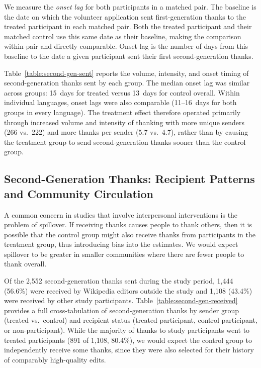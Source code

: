 \documentclass[9pt,twoside,lineno]{pnas-new}
\begin{document}

We measure the \emph{onset lag} for both participants in a matched pair. The baseline is the date on which the volunteer application sent first-generation thanks to the treated participant in each matched pair. Both the treated participant and their matched control use this same date as their baseline, making the comparison within-pair and directly comparable. Onset lag is the number of days from this baseline to the date a given participant sent their first second-generation thanks. %

Table~\ref{table:second-gen-sent} reports the volume, intensity, and onset timing of second-generation thanks sent by each group. The median onset lag was similar across groups: 15~days for treated versus 13~days for control overall. Within individual languages, onset lags were also comparable (11--16~days for both groups in every language). The treatment effect therefore operated primarily through increased volume and intensity of thanking with more unique senders (266 vs.\ 222) and more thanks per sender (5.7 vs.\ 4.7), rather than by causing the treatment group to send second-generation thanks sooner than the control group.

\subsection*{Second-Generation Thanks: Recipient Patterns and Community Circulation}
A common concern in studies that involve interpersonal interventions is the problem of spillover. If receiving thanks causes people to thank others, then it is possible that the control group might also receive thanks from participants in the treatment group, thus introducing bias into the estimates. We would expect spillover to be greater in smaller communities where there are fewer people to thank overall.

Of the 2{,}552 second-generation thanks sent during the study period, 1{,}444 (56.6\%) were received by Wikipedia editors outside the study and 1{,}108 (43.4\%) were received by other study participants. Table~\ref{table:second-gen-received} provides a full cross-tabulation of second-generation thanks by sender group (treated vs.\ control) and recipient status (treated participant, control participant, or non-participant). While the majority of thanks to study participants went to treated participants (891 of 1{,}108, 80.4\%), we would expect the control group to independently receive some thanks, since they were also selected for their history of comparably high-quality edits.
\end{document}
